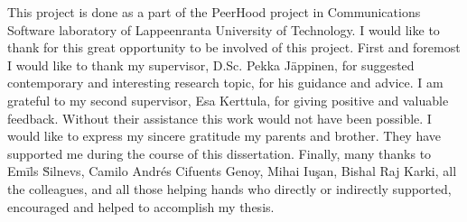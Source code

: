 This project is done as a part of the PeerHood project in Communications Software laboratory of
Lappeenranta University of Technology. I would like to thank for this great opportunity to be
involved of this project.
First and foremost I would like to thank my supervisor, D.Sc. Pekka J\"appinen, for suggested
contemporary and interesting research topic, for his guidance and advice. I am grateful to my second
supervisor, Esa Kerttula, for giving positive and valuable feedback. Without their assistance this
work would not have been possible.
I would like to express my sincere gratitude my parents and brother. They have supported me during
the course of this dissertation.
Finally, many thanks to Em\={i}ls \u{S}i\cb l\cb nevs, Camilo Andr\'{e}s
Cifuents Genoy, Mihai Iu\c{s}an, Bishal Raj Karki, all the colleagues, and all those helping hands
who directly or indirectly supported, encouraged and helped to accomplish my thesis.